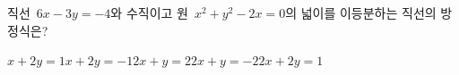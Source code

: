 직선~$6x-3y=-4$와 수직이고 원~$x^2+y^2-2x=0$의 넓이를 이등분하는 직선의 방정식은?
\begin{choicesii}{$x+2y=1$}{$x+2y=-1$}{$2x+y=2$}{$2x+y=-2$}{$2x+2y=1$}\end{choicesii}

